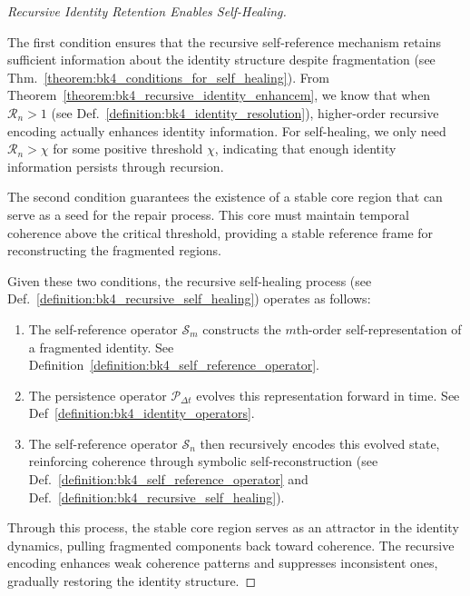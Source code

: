 \begin{proof}[Recursive Identity Retention Enables Self-Healing]
\label{proof:bk4_recursive_self_healing_threshold}
\leavevmode

The first condition ensures that the recursive self-reference mechanism retains sufficient information about the identity structure despite fragmentation (see Thm.~\ref{theorem:bk4_conditions_for_self_healing}). From Theorem~\ref{theorem:bk4_recursive_identity_enhancem}, we know that when $\mathcal{R}_n > 1$ (see Def.~\ref{definition:bk4_identity_resolution}), higher-order recursive encoding actually enhances identity information. For self-healing, we only need $\mathcal{R}_n > \chi$ for some positive threshold $\chi$, indicating that enough identity information persists through recursion.

The second condition guarantees the existence of a stable core region that can serve as a seed for the repair process. This core must maintain temporal coherence above the critical threshold, providing a stable reference frame for reconstructing the fragmented regions.

Given these two conditions, the recursive self-healing process (see Def.~\ref{definition:bk4_recursive_self_healing}) operates as follows:
\begin{enumerate}
    \item The self-reference operator \( \mathcal{S}_m \) constructs the \( m \)th-order self-representation of a fragmented identity. See Definition~\ref{definition:bk4_self_reference_operator}.
    \item The persistence operator \( \mathcal{P}_{\Delta t} \) evolves this representation forward in time. See Def~\ref{definition:bk4_identity_operators}.
    \item The self-reference operator \( \mathcal{S}_n \) then recursively encodes this evolved state, reinforcing coherence through symbolic self-reconstruction (see Def.~\ref{definition:bk4_self_reference_operator} and Def.~\ref{definition:bk4_recursive_self_healing}).
\end{enumerate}

Through this process, the stable core region serves as an attractor in the identity dynamics, pulling fragmented components back toward coherence. The recursive encoding enhances weak coherence patterns and suppresses inconsistent ones, gradually restoring the identity structure.
\end{proof}
